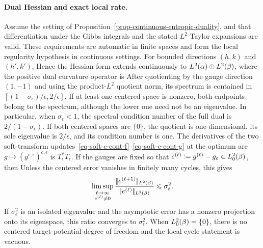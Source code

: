 \paragraph{Dual Hessian and exact local rate.}
\begin{prop}\label{prop-sinkhorn-local-rate}
Assume the setting of Proposition~\ref{prop-continuous-entropic-duality}, and that differentiation under the Gibbs integrals and the stated $L^2$ Taylor expansions are valid. These requirements are automatic in finite spaces and form the local regularity hypothesis in continuous settings. For bounded directions $(h,k)$ and $(h',k')$,
Hence the Hessian form extends continuously to
\(L^2(\alpha)\oplus L^2(\beta)\), where the positive dual curvature operator is
After quotienting by the gauge direction $(1,-1)$ and using the product-$L^2$ quotient norm, its spectrum is contained in $[(1-\sigma_\epsilon)/\epsilon,2/\epsilon]$. If at least one centered space is nonzero, both endpoints belong to the spectrum, although the lower one need not be an eigenvalue. In particular, when $\sigma_\epsilon<1$, the spectral condition number of the full dual is \(2/(1-\sigma_\epsilon)\). If both centered spaces are $\{0\}$, the quotient is one-dimensional, its sole eigenvalue is $2/\epsilon$, and its condition number is one.
The derivatives of the two soft-transform updates~\eqref{eq-soft-c-cont-f}--\eqref{eq-soft-c-cont-g} at the optimum are
\(g\mapsto(g^{\bar c,\epsilon})^{c,\epsilon}\)
is $T_\epsilon^*T_\epsilon$. If the gauges are fixed so that
\(e^{(\ell)}\coloneqq g^{(\ell)}-g_\varepsilon\in L_0^2(\beta)\), then
Unless the centered error vanishes in finitely many cycles, this gives
\[
\limsup_{\substack{\ell\to\infty\\e^{(\ell)}\neq0}}
\frac{|\!| e^{(\ell+1)} |\!|_{L^2(\beta)}}
{|\!| e^{(\ell)} |\!|_{L^2(\beta)}}
\leqslant\sigma_\varepsilon^2.
\]
If $\sigma_\epsilon^2$ is an isolated eigenvalue and the asymptotic error has a nonzero projection onto its eigenspace, this ratio converges to $\sigma_\epsilon^2$. When $L_0^2(\beta)=\{0\}$, there is no centered target-potential degree of freedom and the local cycle statement is vacuous.
\end{prop}
